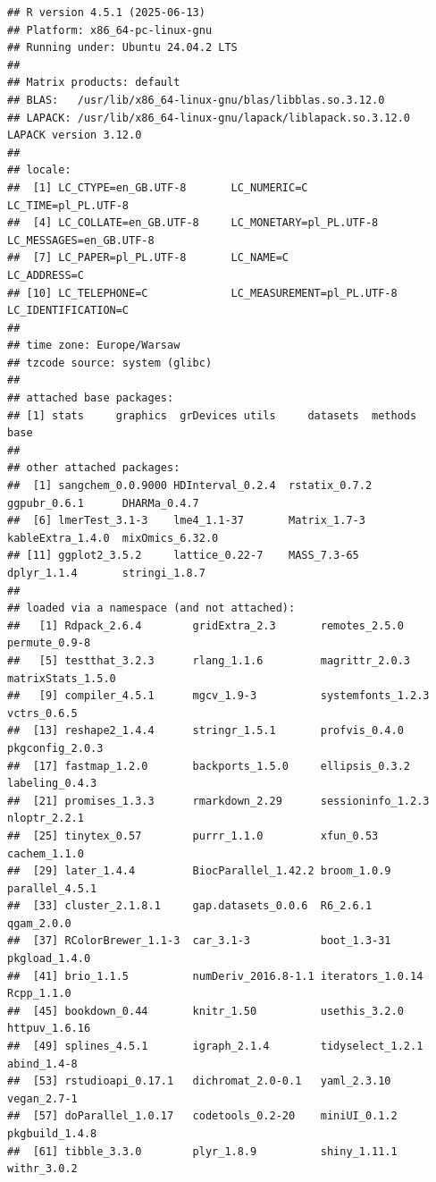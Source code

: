 \documentclass[
]{article}
\begin{document}
\begin{verbatim}
## R version 4.5.1 (2025-06-13)
## Platform: x86_64-pc-linux-gnu
## Running under: Ubuntu 24.04.2 LTS
## 
## Matrix products: default
## BLAS:   /usr/lib/x86_64-linux-gnu/blas/libblas.so.3.12.0 
## LAPACK: /usr/lib/x86_64-linux-gnu/lapack/liblapack.so.3.12.0  LAPACK version 3.12.0
## 
## locale:
##  [1] LC_CTYPE=en_GB.UTF-8       LC_NUMERIC=C               LC_TIME=pl_PL.UTF-8       
##  [4] LC_COLLATE=en_GB.UTF-8     LC_MONETARY=pl_PL.UTF-8    LC_MESSAGES=en_GB.UTF-8   
##  [7] LC_PAPER=pl_PL.UTF-8       LC_NAME=C                  LC_ADDRESS=C              
## [10] LC_TELEPHONE=C             LC_MEASUREMENT=pl_PL.UTF-8 LC_IDENTIFICATION=C       
## 
## time zone: Europe/Warsaw
## tzcode source: system (glibc)
## 
## attached base packages:
## [1] stats     graphics  grDevices utils     datasets  methods   base     
## 
## other attached packages:
##  [1] sangchem_0.0.9000 HDInterval_0.2.4  rstatix_0.7.2     ggpubr_0.6.1      DHARMa_0.4.7     
##  [6] lmerTest_3.1-3    lme4_1.1-37       Matrix_1.7-3      kableExtra_1.4.0  mixOmics_6.32.0  
## [11] ggplot2_3.5.2     lattice_0.22-7    MASS_7.3-65       dplyr_1.1.4       stringi_1.8.7    
## 
## loaded via a namespace (and not attached):
##   [1] Rdpack_2.6.4        gridExtra_2.3       remotes_2.5.0       permute_0.9-8      
##   [5] testthat_3.2.3      rlang_1.1.6         magrittr_2.0.3      matrixStats_1.5.0  
##   [9] compiler_4.5.1      mgcv_1.9-3          systemfonts_1.2.3   vctrs_0.6.5        
##  [13] reshape2_1.4.4      stringr_1.5.1       profvis_0.4.0       pkgconfig_2.0.3    
##  [17] fastmap_1.2.0       backports_1.5.0     ellipsis_0.3.2      labeling_0.4.3     
##  [21] promises_1.3.3      rmarkdown_2.29      sessioninfo_1.2.3   nloptr_2.2.1       
##  [25] tinytex_0.57        purrr_1.1.0         xfun_0.53           cachem_1.1.0       
##  [29] later_1.4.4         BiocParallel_1.42.2 broom_1.0.9         parallel_4.5.1     
##  [33] cluster_2.1.8.1     gap.datasets_0.0.6  R6_2.6.1            qgam_2.0.0         
##  [37] RColorBrewer_1.1-3  car_3.1-3           boot_1.3-31         pkgload_1.4.0      
##  [41] brio_1.1.5          numDeriv_2016.8-1.1 iterators_1.0.14    Rcpp_1.1.0         
##  [45] bookdown_0.44       knitr_1.50          usethis_3.2.0       httpuv_1.6.16      
##  [49] splines_4.5.1       igraph_2.1.4        tidyselect_1.2.1    abind_1.4-8        
##  [53] rstudioapi_0.17.1   dichromat_2.0-0.1   yaml_2.3.10         vegan_2.7-1        
##  [57] doParallel_1.0.17   codetools_0.2-20    miniUI_0.1.2        pkgbuild_1.4.8     
##  [61] tibble_3.3.0        plyr_1.8.9          shiny_1.11.1        withr_3.0.2        

\end{verbatim}
\end{document}
